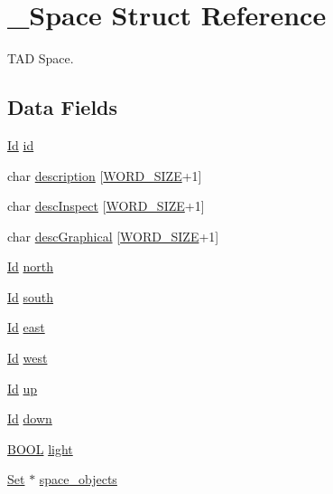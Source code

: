 \hypertarget{struct___space}{\section{\+\_\+\+Space Struct Reference}
\label{struct___space}
}


T\+A\+D Space.  


\subsection*{Data Fields}
\begin{DoxyCompactItemize}
\item 
\hyperlink{_types_8h_a845e604fb28f7e3d97549da3448149d3}{Id} \hyperlink{struct___space_a150a709e86e7134d17cd063de6810b6c}{id}
\item 
char \hyperlink{struct___space_a986940b5717dab72fc54860fd6e0d5fd}{description} \mbox{[}\hyperlink{_types_8h_a92ed8507d1cd2331ad09275c5c4c1c89}{W\+O\+R\+D\+\_\+\+S\+I\+Z\+E}+1\mbox{]}
\item 
char \hyperlink{struct___space_a03234f00395c777593ac3f5b591b51ab}{desc\+Inspect} \mbox{[}\hyperlink{_types_8h_a92ed8507d1cd2331ad09275c5c4c1c89}{W\+O\+R\+D\+\_\+\+S\+I\+Z\+E}+1\mbox{]}
\item 
char \hyperlink{struct___space_aeeb1a7cbcd065a4b3dd012ab2328718a}{desc\+Graphical} \mbox{[}\hyperlink{_types_8h_a92ed8507d1cd2331ad09275c5c4c1c89}{W\+O\+R\+D\+\_\+\+S\+I\+Z\+E}+1\mbox{]}
\item 
\hyperlink{_types_8h_a845e604fb28f7e3d97549da3448149d3}{Id} \hyperlink{struct___space_a8c9fe9c5953834f6bf21b2c0aa9c232c}{north}
\item 
\hyperlink{_types_8h_a845e604fb28f7e3d97549da3448149d3}{Id} \hyperlink{struct___space_a0944887309d1d52fda0ccc7feb5fdda8}{south}
\item 
\hyperlink{_types_8h_a845e604fb28f7e3d97549da3448149d3}{Id} \hyperlink{struct___space_a87a8169b3b69dd4f299b6d0a1974e412}{east}
\item 
\hyperlink{_types_8h_a845e604fb28f7e3d97549da3448149d3}{Id} \hyperlink{struct___space_a2a48d53ab6fa715ffa1280307a865e1f}{west}
\item 
\hyperlink{_types_8h_a845e604fb28f7e3d97549da3448149d3}{Id} \hyperlink{struct___space_a14c9edeb1d5c55f866c6b692673a9c45}{up}
\item 
\hyperlink{_types_8h_a845e604fb28f7e3d97549da3448149d3}{Id} \hyperlink{struct___space_aa3463207bb8fc71e226ecd0477adbca5}{down}
\item 
\hyperlink{_types_8h_a3e5b8192e7d9ffaf3542f1210aec18dd}{B\+O\+O\+L} \hyperlink{struct___space_ad25e653a5a1f98aa808c98dad4918ab1}{light}
\item 
\hyperlink{_set_8h_a6d3b7f7c92cbb4577ef3ef7ddbf93161}{Set} $\ast$ \hyperlink{struct___space_afd7bd267c3be2e34fd4fc0677bb1811e}{space\+\_\+objects}
\end{DoxyCompactItemize}



